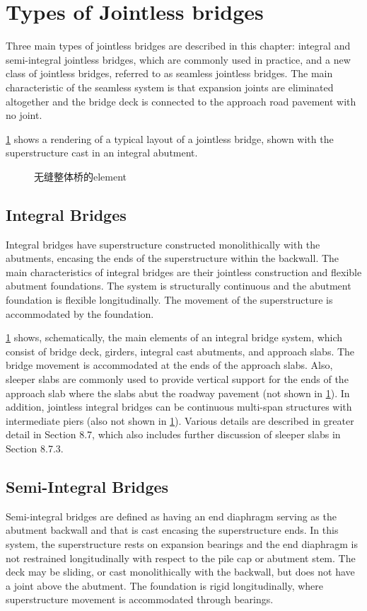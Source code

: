 \section{Types of Jointless bridges}
Three main types of jointless bridges are described in this chapter: integral and semi-integral jointless bridges,
which are commonly used in practice, and a new class of jointless bridges, referred to as seamless jointless bridges.
The main characteristic of the seamless system is that expansion joints are eliminated altogether and the bridge deck is
connected to the approach road pavement with no joint.

\cref{fig:jointless-element} shows a rendering of a typical layout of a jointless bridge, shown with the superstructure cast in an integral abutment.

\begin{figure}
  \caption{无缝整体桥的\gls*{element}}\label{fig:jointless-element}
\end{figure}

\subsection{Integral Bridges}
Integral bridges have superstructure constructed monolithically with the abutments, encasing the ends of the
superstructure within the backwall. The main characteristics of integral bridges are their jointless construction and
flexible abutment foundations. The system is structurally continuous and the abutment foundation is flexible
longitudinally. The movement of the superstructure is accommodated by the foundation.

\cref{fig:jointless-element} shows, schematically, the main elements of an integral bridge system, which consist of bridge deck,
girders, integral cast abutments, and approach slabs. The bridge movement is accommodated at the ends of the
approach slabs. Also, sleeper slabs are commonly used to provide vertical support for the ends of the approach slab
where the slabs abut the roadway pavement (not shown in \cref{fig:jointless-element}). In addition, jointless integral bridges can be
continuous multi-span structures with intermediate piers (also not shown in \cref{fig:jointless-element}). Various details are described
in greater detail in Section 8.7, which also includes further discussion of sleeper slabs in Section 8.7.3.

\subsection{Semi-Integral Bridges}
Semi-integral bridges are defined as having an end diaphragm serving as the abutment backwall and that is cast encasing the superstructure ends. In this system, the superstructure rests on expansion bearings and the end diaphragm is not restrained longitudinally with respect to the pile cap or abutment stem. The deck may be sliding, or cast monolithically with the backwall, but does not have a joint above the abutment. The foundation is rigid longitudinally,
where superstructure movement is accommodated through bearings.

